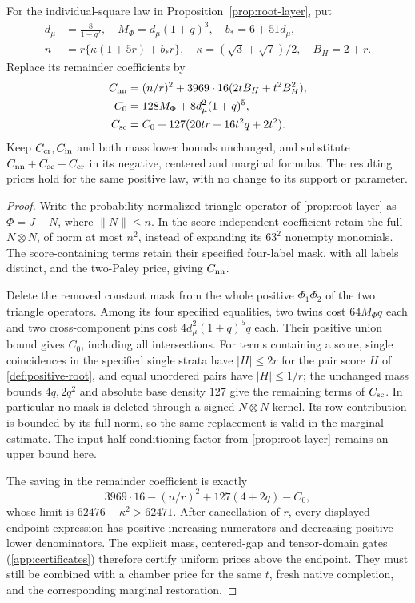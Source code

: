 \begin{proposition}
\label{imp:env:layer-resummation}
For the individual-square law in Proposition~\ref{prop:root-layer}, put
\begin{align*}
 d_\mu&=\frac8{1-q^2},\quad M_\Phi=d_\mu(1+q)^3,
 \quad b_*=6+51d_\mu,\\
 n&=r\{\kappa(1+5r)+b_*r\},\quad
 \kappa=(\sqrt3+\sqrt7)/2,\quad B_H=2+r.
\end{align*}
Replace its remainder coefficients by
\begin{align*}
 C_{\rm nn}&=(n/r)^2+3969\cdot16(2tB_H+t^2B_H^2),\\
 C_0&=128M_\Phi+8d_\mu^2(1+q)^5,\\
 C_{\rm sc}&=C_0+127(20tr+16t^2q+2t^2).
\end{align*}
Keep $C_{\rm cr},C_{\rm in}$ and both mass lower bounds unchanged,
and substitute $C_{\rm nn}+C_{\rm sc}+C_{\rm cr}$ in its negative,
centered and marginal formulas.  The resulting prices hold for
the same positive law, with no change to its support or parameter.
\end{proposition}

\begin{proof}
Write the probability-normalized triangle operator of \cref{prop:root-layer} as $\Phi=J+N$,
where $\|N\|\le n$.  In the score-independent coefficient retain
the full $N\otimes N$, of norm at most $n^2$, instead of expanding
its $63^2$ nonempty monomials.  The score-containing terms retain
their specified four-label mask, with all labels distinct, and the two-Paley
price, giving $C_{\rm nn}$.

Delete the removed constant mask from the whole positive
$\Phi_1\Phi_2$ of the two triangle operators.  Among its four specified equalities, two twins
cost $64M_\Phi q$ each and two cross-component pins cost
$4d_\mu^2(1+q)^5q$ each.  Their positive union bound gives $C_0$,
including all intersections.  For terms containing a score, single
coincidences in the specified single strata have
$|H|\le2r$ for the pair score $H$ of
\cref{def:positive-root}, and equal unordered pairs
have $|H|\le1/r$; the unchanged mass bounds $4q,2q^2$ and
absolute base density $127$ give the remaining terms of $C_{\rm sc}$.
In particular no mask is deleted through a signed $N\otimes N$
kernel.  Its row contribution is bounded by its full norm, so the
same replacement is valid in the marginal estimate.
The input-half conditioning factor from \cref{prop:root-layer} remains an upper bound here.

The saving in the remainder coefficient is exactly
\[
 3969\cdot16-(n/r)^2+127(4+2q)-C_0,
\]
whose limit is $62476-\kappa^2>62471$.
After cancellation of $r$, every displayed endpoint expression has
positive increasing numerators and decreasing positive lower
denominators.  The explicit mass, centered-gap and tensor-domain
gates (\cref{app:certificates}) therefore certify uniform prices above the endpoint.
They must still be combined with a chamber price for the same $t$,
fresh native completion, and the corresponding marginal restoration.
\end{proof}


